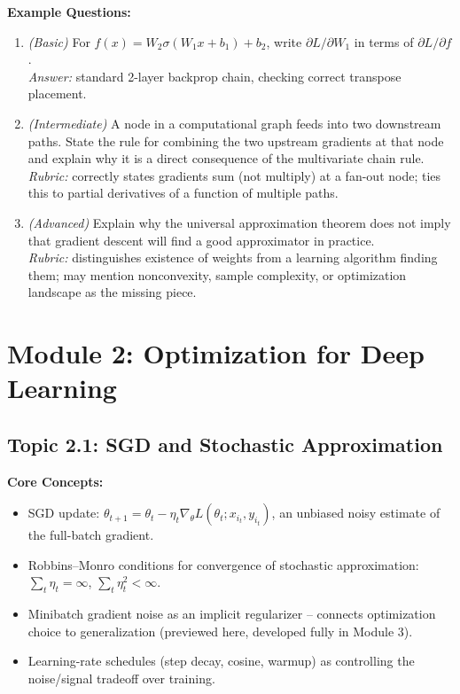\documentclass[11pt]{article}
\begin{document}
\textbf{Example Questions:}
\begin{enumerate}
  \item \textit{(Basic)} For $f(x) = W_2 \sigma(W_1 x + b_1) + b_2$, write $\partial L/\partial W_1$ in terms of $\partial L/\partial f$. \\
  \textit{Answer:} standard 2-layer backprop chain, checking correct transpose placement.
  \item \textit{(Intermediate)} A node in a computational graph feeds into two downstream paths. State the rule for combining the two upstream gradients at that node and explain why it is a direct consequence of the multivariate chain rule. \\
  \textit{Rubric:} correctly states gradients sum (not multiply) at a fan-out node; ties this to partial derivatives of a function of multiple paths.
  \item \textit{(Advanced)} Explain why the universal approximation theorem does not imply that gradient descent will find a good approximator in practice. \\
  \textit{Rubric:} distinguishes existence of weights from a learning algorithm finding them; may mention nonconvexity, sample complexity, or optimization landscape as the missing piece.
\end{enumerate}

\section{Module 2: Optimization for Deep Learning}

\subsection{Topic 2.1: SGD and Stochastic Approximation}

\textbf{Core Concepts:}
\begin{itemize}
  \item SGD update: $\theta_{t+1} = \theta_t - \eta_t \nabla_\theta L(\theta_t; x_{i_t}, y_{i_t})$, an unbiased noisy estimate of the full-batch gradient.
  \item Robbins--Monro conditions for convergence of stochastic approximation: $\sum_t \eta_t = \infty$, $\sum_t \eta_t^2 < \infty$.
  \item Minibatch gradient noise as an implicit regularizer -- connects optimization choice to generalization (previewed here, developed fully in Module 3).
  \item Learning-rate schedules (step decay, cosine, warmup) as controlling the noise/signal tradeoff over training.
\end{itemize}
\end{document}
